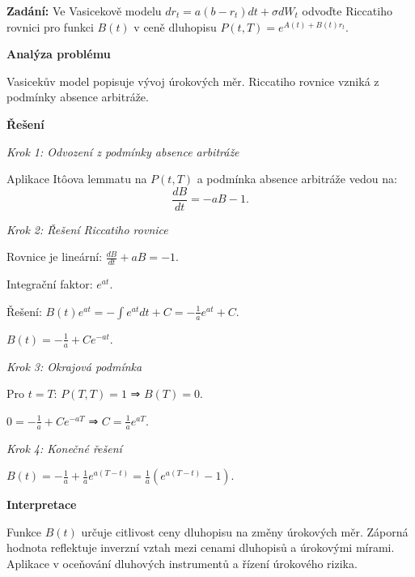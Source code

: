 \begin{example}
\label{ex:c2-lehky-vasicek}

\noindent\textbf{Zadání:} Ve Vasicekově modelu $dr_t = a(b - r_t)dt + \sigma dW_t$ odvoďte Riccatiho rovnici pro funkci $B(t)$ v ceně dluhopisu $P(t,T) = e^{A(t) + B(t)r_t}$.

\vspace{1.5\baselineskip}

\noindent\textbf{Analýza problému}

\noindent Vasicekův model popisuje vývoj úrokových měr. Riccatiho rovnice vzniká z podmínky absence arbitráže.

\vspace{1.5\baselineskip}

\noindent\textbf{Řešení}

\noindent\textit{Krok 1: Odvození z podmínky absence arbitráže}

Aplikace Itôova lemmatu na $P(t,T)$ a podmínka absence arbitráže vedou na:
\[
\frac{dB}{dt} = -aB - 1.
\]

\noindent\textit{Krok 2: Řešení Riccatiho rovnice}

Rovnice je lineární: $\frac{dB}{dt} + aB = -1$.

Integrační faktor: $e^{at}$.

Řešení: $B(t)e^{at} = -\int e^{at}dt + C = -\frac{1}{a}e^{at} + C$.

$B(t) = -\frac{1}{a} + Ce^{-at}$.

\noindent\textit{Krok 3: Okrajová podmínka}

Pro $t = T$: $P(T,T) = 1$ ⇒ $B(T) = 0$.

$0 = -\frac{1}{a} + Ce^{-aT}$ ⇒ $C = \frac{1}{a}e^{aT}$.

\noindent\textit{Krok 4: Konečné řešení}

$B(t) = -\frac{1}{a} + \frac{1}{a}e^{a(T-t)} = \frac{1}{a}(e^{a(T-t)} - 1)$.

\vspace{1.5\baselineskip}

\noindent\textbf{Interpretace}

Funkce $B(t)$ určuje citlivost ceny dluhopisu na změny úrokových měr. 
Záporná hodnota reflektuje inverzní vztah mezi cenami dluhopisů a úrokovými mírami. 
Aplikace v oceňování dluhových instrumentů a řízení úrokového rizika.

\end{example}

\vspace{2\baselineskip}

